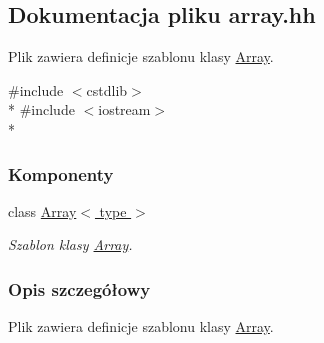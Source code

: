 \hypertarget{array_8hh}{\subsection{Dokumentacja pliku array.\-hh}
\label{array_8hh}
}


Plik zawiera definicje szablonu klasy \hyperlink{class_array}{Array}.  


{\ttfamily \#include $<$cstdlib$>$}\\*
{\ttfamily \#include $<$iostream$>$}\\*
\subsubsection*{Komponenty}
\begin{DoxyCompactItemize}
\item 
class \hyperlink{class_array}{Array$<$ type $>$}
\begin{DoxyCompactList}\small\item\em Szablon klasy \hyperlink{class_array}{Array}. \end{DoxyCompactList}\end{DoxyCompactItemize}


\subsubsection{Opis szczegółowy}
Plik zawiera definicje szablonu klasy \hyperlink{class_array}{Array}. 